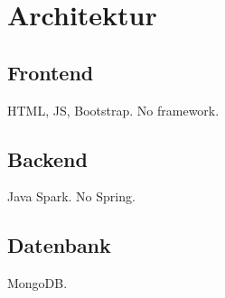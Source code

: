 \section{Architektur}\label{sec:architecture}

\subsection{Frontend}\label{subsec:frontend}

HTML, JS, Bootstrap.
No framework.

\subsection{Backend}\label{subsec:backend}

Java Spark.
No Spring.

\subsection{Datenbank}\label{subsec:database}

MongoDB\@.
